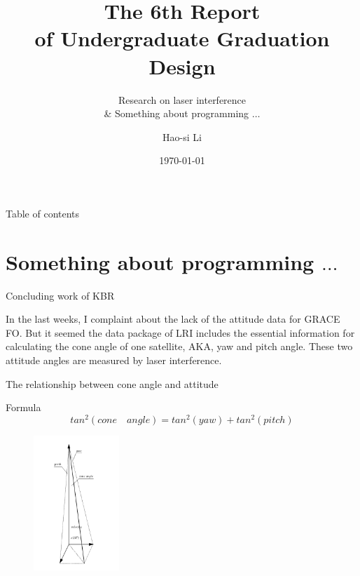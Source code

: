 \documentclass{beamer}
\title[
    The 6th Report of Undergraduate Graduation Design
]{The 6th Report \\ of Undergraduate Graduation Design}
\subtitle{Research on laser interference \\ \& Something about programming $\dots$}
\author[Hao-si Li]{Hao-si Li}
\institute[Taiji Program]{The Department of Geophysics\\ Chang'an University}
\date{\today}
\begin{document}
\begin{frame}
\titlepage
\end{frame}


\begin{frame}{Table of contents}
\tableofcontents
\end{frame}


\section{Something about programming $\dots$}


\begin{frame}[fragile]{Concluding work of KBR}

In the last weeks, I complaint about the lack of the attitude data for GRACE FO. But it seemed the data package of LRI includes the essential information for calculating the cone angle of one satellite, AKA, \alert{yaw and pitch angle}. These two attitude angles are measured by laser interference.

\end{frame}


\begin{frame}[fragile]{The relationship between cone angle and attitude}

\begin{block}{Formula}
    \begin{equation}
        tan^2(cone \quad angle)=tan^2(yaw) + tan^2(pitch)
    \end{equation}
\end{block}

\begin{figure}
    \includegraphics[height=2in]{images//cone_angle_relationship.png}
\end{figure}

\end{frame}
\end{document}
